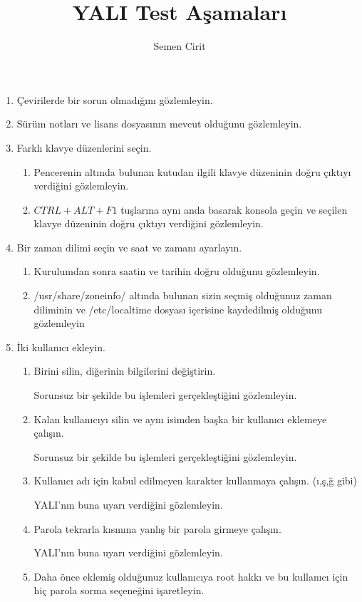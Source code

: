 \documentclass[a4paper,10pt]{article}
\title{YALI Test Aşamaları}
\author{Semen Cirit}
\begin{document}
\maketitle
\begin{enumerate}
\item Çevirilerde bir sorun olmadığını gözlemleyin.
\item Sürüm notları ve lisans dosyasının mevcut olduğunu gözlemleyin.
\item Farklı klavye düzenlerini seçin.
	\begin{enumerate}	
	\item Pencerenin altında bulunan kutudan ilgili klavye düzeninin doğru çıktıyı verdiğini gözlemleyin.

	\item $CTRL+ALT+F1$ tuşlarına aynı anda basarak konsola geçin ve seçilen klavye düzeninin doğru çıktıyı verdiğini gözlemleyin.
	\end{enumerate}
\item Bir zaman dilimi seçin ve saat ve zamanı ayarlayın.


    \begin{enumerate}
	\item Kurulumdan sonra saatin ve tarihin doğru olduğunu gözlemleyin.
        \item /usr/share/zoneinfo/ altında bulunan sizin seçmiş olduğunuz zaman diliminin ve /etc/localtime dosyası içerisine kaydedilmiş olduğunu gözlemleyin
    \end{enumerate}
\item İki kullanıcı ekleyin.
\begin{enumerate}
	\item Birini silin, diğerinin bilgilerini değiştirin.

	Sorunsuz bir şekilde bu işlemleri gerçekleştiğini gözlemleyin.
	\item Kalan kullanıcıyı silin ve aynı isimden başka bir kullanıcı eklemeye çalışın.

	Sorunsuz bir şekilde bu işlemleri gerçekleştiğini gözlemleyin.
	\item Kullanıcı adı için kabul edilmeyen karakter kullanmaya çalışın. (ı,ş,ğ gibi)
	
	YALI'nın buna uyarı verdiğini gözlemleyin.
	\item Parola tekrarla kısmına yanlış bir parola girmeye çalışın.

	YALI'nın buna uyarı verdiğini gözlemleyin.

\item Daha önce eklemiş olduğunuz kullanıcıya root hakkı ve bu kullanıcı için hiç parola sorma seçeneğini işaretleyin.


\end{enumerate}
\end{enumerate}
\end{document}
